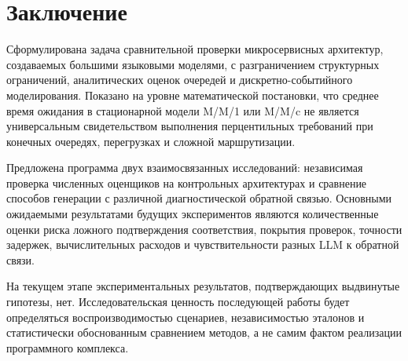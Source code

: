 \section{Заключение}

Сформулирована задача сравнительной проверки микросервисных архитектур, создаваемых большими языковыми моделями, с разграничением структурных ограничений, аналитических оценок очередей и дискретно-событийного моделирования. Показано на уровне математической постановки, что среднее время ожидания в стационарной модели M/M/1 или M/M/c не является универсальным свидетельством выполнения перцентильных требований при конечных очередях, перегрузках и сложной маршрутизации.

Предложена программа двух взаимосвязанных исследований: независимая проверка численных оценщиков на контрольных архитектурах и сравнение способов генерации с различной диагностической обратной связью. Основными ожидаемыми результатами будущих экспериментов являются количественные оценки риска ложного подтверждения соответствия, покрытия проверок, точности задержек, вычислительных расходов и чувствительности разных LLM к обратной связи.

На текущем этапе экспериментальных результатов, подтверждающих выдвинутые гипотезы, нет. Исследовательская ценность последующей работы будет определяться воспроизводимостью сценариев, независимостью эталонов и статистически обоснованным сравнением методов, а не самим фактом реализации программного комплекса.
